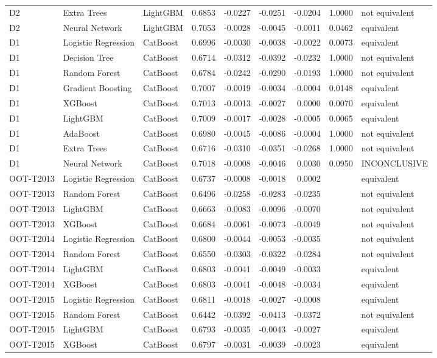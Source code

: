 \begin{table}[t]
{\begin{tabular}{lllrrrrrl}
D2 & Extra Trees & LightGBM & 0.6853 & -0.0227 & -0.0251 & -0.0204 & 1.0000 & not equivalent \\
D2 & Neural Network & LightGBM & 0.7053 & -0.0028 & -0.0045 & -0.0011 & 0.0462 & equivalent \\
D1 & Logistic Regression & CatBoost & 0.6996 & -0.0030 & -0.0038 & -0.0022 & 0.0073 & equivalent \\
D1 & Decision Tree & CatBoost & 0.6714 & -0.0312 & -0.0392 & -0.0232 & 1.0000 & not equivalent \\
D1 & Random Forest & CatBoost & 0.6784 & -0.0242 & -0.0290 & -0.0193 & 1.0000 & not equivalent \\
D1 & Gradient Boosting & CatBoost & 0.7007 & -0.0019 & -0.0034 & -0.0004 & 0.0148 & equivalent \\
D1 & XGBoost & CatBoost & 0.7013 & -0.0013 & -0.0027 & 0.0000 & 0.0070 & equivalent \\
D1 & LightGBM & CatBoost & 0.7009 & -0.0017 & -0.0028 & -0.0005 & 0.0065 & equivalent \\
D1 & AdaBoost & CatBoost & 0.6980 & -0.0045 & -0.0086 & -0.0004 & 1.0000 & not equivalent \\
D1 & Extra Trees & CatBoost & 0.6716 & -0.0310 & -0.0351 & -0.0268 & 1.0000 & not equivalent \\
D1 & Neural Network & CatBoost & 0.7018 & -0.0008 & -0.0046 & 0.0030 & 0.0950 & INCONCLUSIVE \\
OOT-T2013 & Logistic Regression & CatBoost & 0.6737 & -0.0008 & -0.0018 & 0.0002 &  & equivalent \\
OOT-T2013 & Random Forest & CatBoost & 0.6496 & -0.0258 & -0.0283 & -0.0235 &  & not equivalent \\
OOT-T2013 & LightGBM & CatBoost & 0.6663 & -0.0083 & -0.0096 & -0.0070 &  & not equivalent \\
OOT-T2013 & XGBoost & CatBoost & 0.6684 & -0.0061 & -0.0073 & -0.0049 &  & not equivalent \\
OOT-T2014 & Logistic Regression & CatBoost & 0.6800 & -0.0044 & -0.0053 & -0.0035 &  & not equivalent \\
OOT-T2014 & Random Forest & CatBoost & 0.6550 & -0.0303 & -0.0322 & -0.0284 &  & not equivalent \\
OOT-T2014 & LightGBM & CatBoost & 0.6803 & -0.0041 & -0.0049 & -0.0033 &  & equivalent \\
OOT-T2014 & XGBoost & CatBoost & 0.6803 & -0.0041 & -0.0048 & -0.0034 &  & equivalent \\
OOT-T2015 & Logistic Regression & CatBoost & 0.6811 & -0.0018 & -0.0027 & -0.0008 &  & equivalent \\
OOT-T2015 & Random Forest & CatBoost & 0.6442 & -0.0392 & -0.0413 & -0.0372 &  & not equivalent \\
OOT-T2015 & LightGBM & CatBoost & 0.6793 & -0.0035 & -0.0043 & -0.0027 &  & equivalent \\
OOT-T2015 & XGBoost & CatBoost & 0.6797 & -0.0031 & -0.0039 & -0.0023 &  & equivalent \\
\bottomrule
\end{tabular}}
\end{table}
